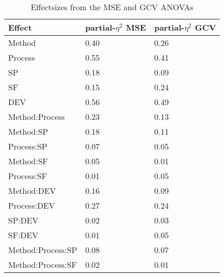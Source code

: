 \documentclass[man, floatsintext]{apa7}
\begin{document}
\begin{table}[tbp]

  \begin{center}
    \begin{threeparttable}
      \caption{Effectsizes from the MSE and GCV ANOVAs}
      \label{tab:peta}
      \begin{tabular}{lll}
        \toprule
        Effect                & \multicolumn{1}{c}{partial-$\eta^2$ MSE} &
        \multicolumn{1}{c}{partial-$\eta^2$ GCV}
        \\
        \midrule
        Method                & 0.40                                     & 0.26
        \\
        Process               & 0.55                                     & 0.41
        \\
        SP                    & 0.18                                     & 0.09
        \\
        SF                    & 0.15                                     & 0.24
        \\
        DEV                   & 0.56                                     & 0.49
        \\
        Method:Process        & 0.23                                     & 0.13
        \\
        Method:SP             & 0.18                                     & 0.11
        \\
        Process:SP            & 0.07                                     & 0.05
        \\
        Method:SF             & 0.05                                     & 0.01
        \\
        Process:SF            & 0.01                                     & 0.05
        \\
        Method:DEV            & 0.16                                     & 0.09
        \\
        Process:DEV           & 0.27                                     & 0.24
        \\
        SP:DEV                & 0.02                                     & 0.03
        \\
        SF:DEV                & 0.01                                     & 0.05
        \\
        Method:Process:SP     & 0.08                                     & 0.07
        \\
        Method:Process:SF     & 0.02                                     & 0.01

\end{tabular}
\end{threeparttable}
\end{center}
\end{table}
\end{document}
